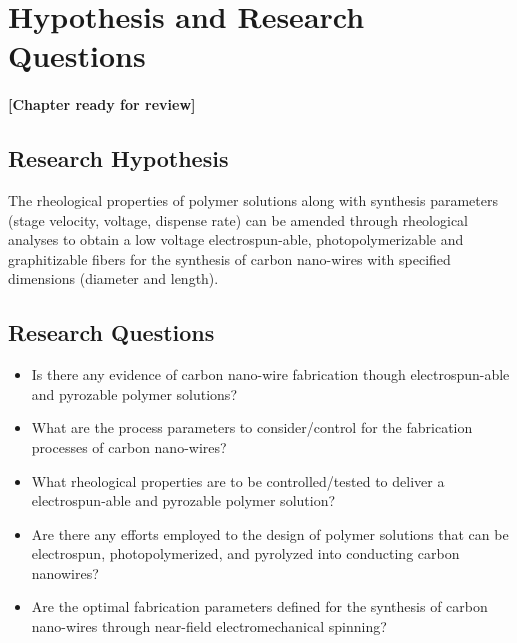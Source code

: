 
\chapter{Hypothesis and Research Questions} %

\label{Chapter:HypothesisandResearchQuestions}

\subsubsection*{\color{mygray}[Chapter ready for review]}

\section{Research Hypothesis}

The rheological properties of polymer solutions along with synthesis parameters (stage velocity, voltage, dispense rate) can be amended through rheological analyses to obtain a low voltage electrospun-able, photopolymerizable and graphitizable fibers for the synthesis of carbon nano-wires with specified dimensions (diameter and length).

\section{Research Questions}

\begin{itemize}
	\item{
	Is there any evidence of carbon nano-wire fabrication though electrospun-able and pyrozable polymer solutions?
	}
	\item{
	What are the process parameters to consider/control for the fabrication processes of carbon nano-wires? 
	}
	\item{
	What rheological properties are to be controlled/tested to deliver a electrospun-able and pyrozable polymer solution?	
	}
	\item{
	Are there any efforts employed to the design of polymer solutions that can be electrospun, photopolymerized, and pyrolyzed into conducting carbon nanowires?
	}
	\item{
	Are the optimal fabrication parameters defined \cite{Cardenas2017} for the synthesis of carbon nano-wires through near-field electromechanical spinning?	
	}
\end{itemize}





